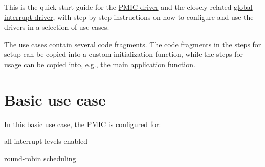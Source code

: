 This is the quick start guide for the \hyperlink{group__pmic__group}{P\-M\-I\-C driver} and the closely related \hyperlink{group__interrupt__group}{global interrupt driver}, with step-\/by-\/step instructions on how to configure and use the drivers in a selection of use cases.

The use cases contain several code fragments. The code fragments in the steps for setup can be copied into a custom initialization function, while the steps for usage can be copied into, e.\-g., the main application function.\hypertarget{xmega_pmic_quickstart_pmic_basic_use_case}{}\section{Basic use case}\label{xmega_pmic_quickstart_pmic_basic_use_case}
In this basic use case, the P\-M\-I\-C is configured for\-:
\begin{DoxyItemize}
\item all interrupt levels enabled
\item round-\/robin scheduling
\end{DoxyItemize}

